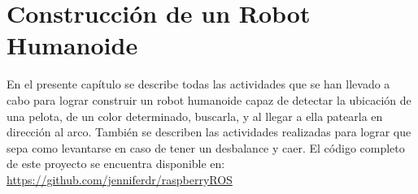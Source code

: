 \chapter{Construcci\'on de un Robot Humanoide}\label{chapter:introAdesarrollo}

En el presente capítulo se describe todas las actividades que se han llevado a cabo para lograr construir un robot humanoide capaz de detectar la ubicación de una pelota, de un color determinado, buscarla, y al llegar a ella patearla en direcci\'on al arco. También se describen las actividades realizadas para lograr que sepa como levantarse en caso de tener un desbalance y caer.
El c\'odigo completo de este proyecto se encuentra disponible en: \url{ https://github.com/jenniferdr/raspberryROS}     



